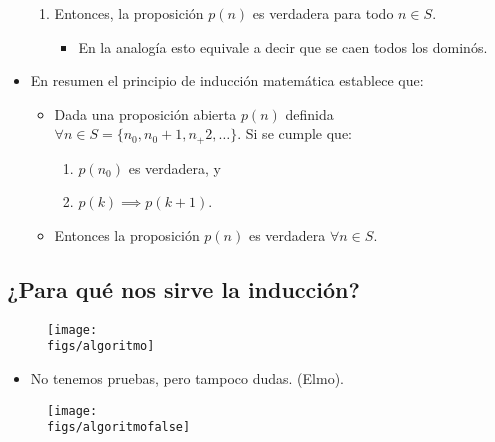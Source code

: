 \begin{itemize}
\begin{enumerate}
            \item Entonces, la proposición $p(n)$ es verdadera para todo $n \in S$.
                \begin{itemize}
                    \item En la analogía esto equivale a decir que se caen todos los dominós.
                \end{itemize}
        \end{enumerate}
    
    \item En resumen el principio de inducción matemática establece que: 
        \begin{itemize}
            \item Dada una proposición abierta $p(n)$ definida $\forall n \in S = \{n_0,n_0+1,n_+2,\dots\}$. Si se cumple que: 
                \begin{enumerate}
                    \item $p(n_0)$ es verdadera, y 
                    \item $p(k) \implies p(k+1)$.
                \end{enumerate}
            
            \item Entonces la proposición $p(n)$ es verdadera $\forall n \in S$.
        \end{itemize}
\end{itemize}

\subsection{¿Para qué nos sirve la inducción?}
\begin{figure}[H]
    \centering
    \texttt{[image: \\figs/algoritmo]} 
\end{figure}
\begin{itemize}
    \item No tenemos pruebas, pero tampoco dudas. (Elmo).
\end{itemize}
\begin{figure}[H]
    \centering
    \texttt{[image: \\figs/algoritmofalse]} 
\end{figure}

